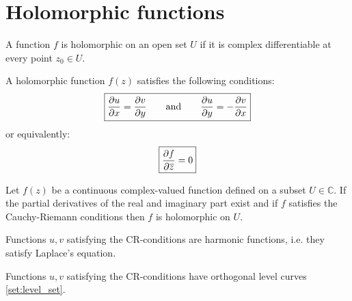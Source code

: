 \section{Holomorphic functions}
        
        \begin{definition}[Holomorphic]
	        A function $f$ is holomorphic on an open set $U$ if it is complex differentiable at every point $z_0\in U$. 
        \end{definition}
        
        \begin{property}
	        A holomorphic function $f(z)$ satisfies the following conditions:
	        \begin{equation}
	                \label{complexcalculus:cauchy_riemann}
	                \boxed{\frac{\partial u}{\partial x} = \frac{\partial v}{\partial y} \text{\qquad and\qquad} \frac{\partial u}{\partial y} = -\frac{\partial v}{\partial x}}
	        \end{equation}
	        or equivalently:
	        \begin{equation}
	                \label{complexcalculus:holomorphic_alternative_condition}
	                \boxed{\frac{\partial f}{\partial \overline{z}} = 0}
	        \end{equation}
        \end{property}
        
        \begin{theorem}
        	Let $f(z)$ be a continuous complex-valued function defined on a subset $U\in\mathbb{C}$. If the partial derivatives of the real and imaginary part exist and if $f$ satisfies the Cauchy-Riemann conditions then $f$ is holomorphic on $U$.
        \end{theorem}

	\begin{property}
		Functions $u,v$ satisfying the CR-conditions are harmonic functions, i.e. they satisfy Laplace's equation.
	\end{property}
	\begin{property}
		Functions $u,v$ satisfying the CR-conditions have orthogonal level curves \ref{set:level_set}.
	\end{property}

